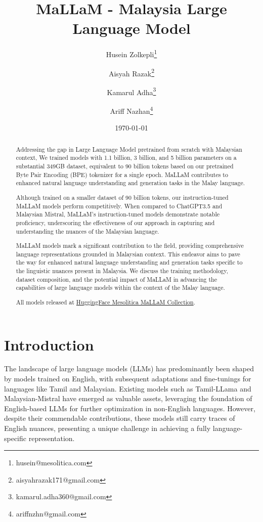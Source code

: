 \documentclass{article}
\title{MaLLaM - Malaysia Large Language Model}
\author{
  Husein Zolkepli\thanks{husein@mesolitica.com} \and 
  Aisyah Razak\thanks{aisyahrazak171@gmail.com} \and
  Kamarul Adha\thanks{kamarul.adha360@gmail.com} \and
  Ariff Nazhan\thanks{ariffnzhn@gmail.com}
}
\date{\today}
\begin{document}
\maketitle

\begin{abstract}
  Addressing the gap in Large Language Model pretrained from scratch with Malaysian context, We trained models with 1.1 billion, 3 billion, and 5 billion parameters on a substantial 349GB dataset, equivalent to 90 billion tokens based on our pretrained Byte Pair Encoding (BPE) tokenizer for a single epoch. MaLLaM contributes to enhanced natural language understanding and generation tasks in the Malay language.

  Although trained on a smaller dataset of 90 billion tokens, our instruction-tuned MaLLaM models perform competitively. When compared to ChatGPT3.5 and Malaysian Mistral, MaLLaM's instruction-tuned models demonstrate notable proficiency, underscoring the effectiveness of our approach in capturing and understanding the nuances of the Malaysian language.

  MaLLaM models mark a significant contribution to the field, providing comprehensive language representations grounded in Malaysian context. This endeavor aims to pave the way for enhanced natural language understanding and generation tasks specific to the linguistic nuances present in Malaysia. We discuss the training methodology, dataset composition, and the potential impact of MaLLaM in advancing the capabilities of large language models within the context of the Malay language.

  All models released at \href{https://huggingface.co/collections/mesolitica/mallam-6577b59d1e0b436ae75f930f}{HuggingFace Mesolitica MaLLaM Collection}.

\end{abstract}

\section{Introduction}

The landscape of large language models (LLMs) has predominantly been shaped by models trained on English, with subsequent adaptations and fine-tunings for languages like Tamil and Malaysian. Existing models such as Tamil-LLama \cite{balachandran2023tamilllama} and Malaysian-Mistral \cite{zolkepli2024large} have emerged as valuable assets, leveraging the foundation of English-based LLMs for further optimization in non-English languages. However, despite their commendable contributions, these models still carry traces of English nuances, presenting a unique challenge in achieving a fully language-specific representation.
\end{document}
